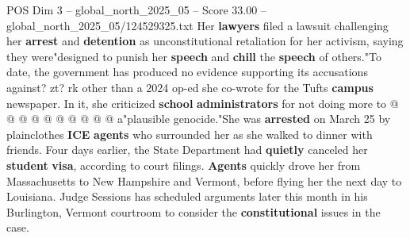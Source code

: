 \begin{textsample}{POS Dim 3 – global\_north\_2025\_05 – Score 33.00 – global\_north\_2025\_05/124529325.txt}
Her \textbf{lawyers} filed a lawsuit challenging her \textbf{arrest} and \textbf{detention} as unconstitutional retaliation for her activism, saying they were"designed to punish her \textbf{speech} and \textbf{chill} the \textbf{speech} of others."To date, the government has produced no evidence supporting its accusations against? zt? rk other than a 2024 op-ed she co-wrote for the Tufts \textbf{campus} newspaper.
In it, she criticized \textbf{school} \textbf{administrators} for not doing more to @ @ @ @ @ @ @ @ @ @ a"plausible genocide."She was \textbf{arrested} on March 25 by plainclothes \textbf{ICE} \textbf{agents} who surrounded her as she walked to dinner with friends.
Four days earlier, the State Department had \textbf{quietly} canceled her \textbf{student} \textbf{visa}, according to court filings. \textbf{Agents} quickly drove her from Massachusetts to New Hampshire and Vermont, before flying her the next day to Louisiana.
Judge Sessions has scheduled arguments later this month in his Burlington, Vermont courtroom to consider the \textbf{constitutional} issues in the case.

\end{textsample}

